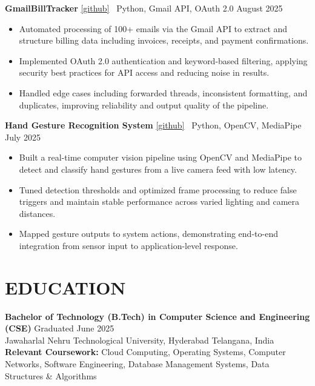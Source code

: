 \documentclass[letterpaper,11pt]{article}
\begin{document}
\noindent\textbf{GmailBillTracker} \href{https://github.com/Gogeta0011/GmailBillTracker}{[github]} \textbar\ Python, Gmail API, OAuth 2.0 \hfill August 2025
\begin{itemize}
  \item Automated processing of 100+ emails via the Gmail API to extract and structure billing data including invoices, receipts, and payment confirmations.
  \item Implemented OAuth 2.0 authentication and keyword-based filtering, applying security best practices for API access and reducing noise in results.
  \item Handled edge cases including forwarded threads, inconsistent formatting, and duplicates, improving reliability and output quality of the pipeline.
\end{itemize}
\noindent\textbf{Hand Gesture Recognition System} \href{https://github.com/Gogeta0011/Hand-Gestures}{[github]} \textbar\ Python, OpenCV, MediaPipe \hfill July 2025
\begin{itemize}
  \item Built a real-time computer vision pipeline using OpenCV and MediaPipe to detect and classify hand gestures from a live camera feed with low latency.
  \item Tuned detection thresholds and optimized frame processing to reduce false triggers and maintain stable performance across varied lighting and camera distances.
  \item Mapped gesture outputs to system actions, demonstrating end-to-end integration from sensor input to application-level response.
\end{itemize}

\section{EDUCATION}
\textbf{Bachelor of Technology (B.Tech) in Computer Science and Engineering (CSE)} \hfill Graduated June 2025\\
Jawaharlal Nehru Technological University, Hyderabad \hfill Telangana, India\\
\textbf{Relevant Coursework:} Cloud Computing, Operating Systems, Computer Networks, Software Engineering, Database Management Systems, Data Structures \& Algorithms
\end{document}
